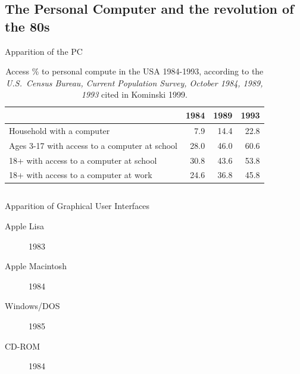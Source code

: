 \documentclass[aspectratio=169]{beamer}
\begin{document}
\subsection{The Personal Computer and the revolution of the 80s}

\begin{frame}{Apparition of the PC}

\begin{table}[h]
    \centering
    \footnotesize
    \begin{tabular}{l|rrr}
                                                   & 1984 & 1989 & 1993 \\ \hline  \hline
    Household with a computer & 7.9 & 14.4 & 22.8 \\ \hline 
    Ages 3-17 with access to a computer at school & 28.0 & 46.0 & 60.6 \\
    18+ with access to a computer at school & 30.8 & 43.6 & 53.8 \\
    18+ with access to a computer at work & 24.6 & 36.8 & 45.8 \\ \hline
    \end{tabular}
    \caption{Access \% to personal compute in the USA 1984-1993, according to the \textit{U.S.~Census Bureau, Current Population Survey, October 1984, 1989, 1993} cited in Kominski 1999.}
    \label{tab:computer-ownership}
\end{table}

\begin{columns}
    \begin{column}{.45\textwidth}
        Apparition of Graphical User Interfaces
    
        \begin{description}
            \item[Apple Lisa] 1983 
            \item[Apple Macintosh] 1984
            \item[Windows/DOS] 1985
            \item[CD-ROM] 1984
        \end{description}
    \end{column}\hfill
    \begin{column}{.45\textwidth}
    \end{column}
\end{columns}

\end{frame}
\end{document}
